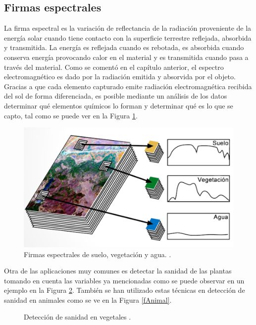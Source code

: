 \subsection{Firmas espectrales}
\label{FirmasEspectrales}
La firma espectral es la variación de reflectancia de la radiación proveniente de la energía solar cuando tiene contacto con la superficie terrestre reflejada, absorbida y transmitida. La energía es reflejada cuando es rebotada, es absorbida cuando conserva energía provocando calor en el material y es transmitida cuando pasa a través del material. Como se comentó en el capítulo anterior, el espectro electromagnético es dado por la radiación emitida y absorvida por el objeto. Gracias a que cada elemento capturado emite radiación electromagnética recibida del sol de forma diferenciada, es posible mediante un análisis de los datos determinar qué elementos químicos lo forman y determinar qué es lo que se capto, tal como se puede ver en la Figura \ref{fFirma}. \cite{AVIRIS}

\begin{figure}[h]
  \centering
  \includegraphics[width=.7\textwidth]{./images/firma.png}
  \centering
  \caption{Firmas espectrales de suelo, vegetación y agua. \cite{Quinones}.}
  \label{fFirma}
\end{figure}
Otra de las aplicaciones muy comunes es detectar la sanidad de las plantas tomando en cuenta las variables ya mencionadas como se puede observar en un ejemplo en la Figura \ref{fSanidad}. También se han utilizado estas técnicas en detección de sanidad en animales \cite{animal} como se ve en la Figura \ref{fAnimal}. \cite{medical}

\begin{figure}[h]
  \centering
  \centering
  \caption{Detección de sanidad en vegetales \cite{chile}.}
  \label{fSanidad}
\end{figure}

